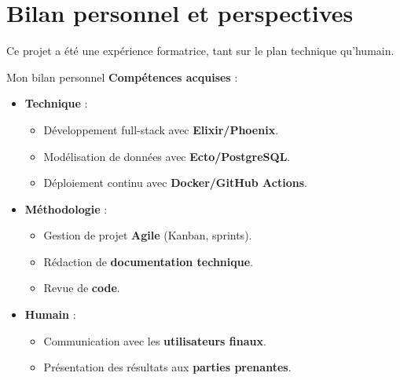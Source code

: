\newpage

\section{Bilan personnel et perspectives}
Ce projet a été une expérience formatrice, tant sur le plan technique qu’humain.
\newline

\begin{for_you}{Mon bilan personnel}
    \textbf{Compétences acquises} :
    \begin{itemize}
        \item \textbf{Technique} :
              \begin{itemize}
                  \item Développement full-stack avec \textbf{Elixir/Phoenix}.
                  \item Modélisation de données avec \textbf{Ecto/PostgreSQL}.
                  \item Déploiement continu avec \textbf{Docker/GitHub Actions}.
              \end{itemize}
        \item \textbf{Méthodologie} :
              \begin{itemize}
                  \item Gestion de projet \textbf{Agile} (Kanban, sprints).
                  \item Rédaction de \textbf{documentation technique}.
                  \item Revue de \textbf{code}.
              \end{itemize}
        \item \textbf{Humain} :
              \begin{itemize}
                  \item Communication avec les \textbf{utilisateurs finaux}.
                  \item Présentation des résultats aux \textbf{parties prenantes}.
              \end{itemize}
    \end{itemize}

    \text{\newline}


\end{for_you}
